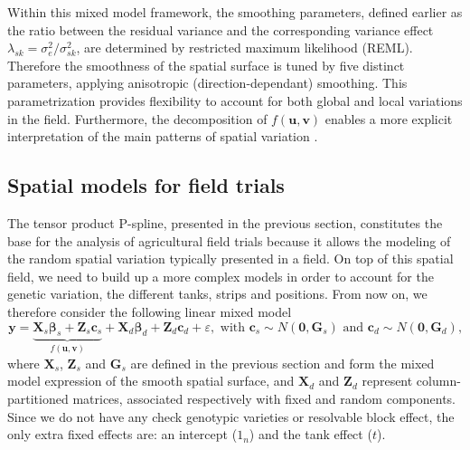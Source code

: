 Within this mixed model framework, the smoothing parameters, defined earlier as the ratio between the residual variance and the
corresponding variance effect $\lambda_{sk} = \sigma^2_{e} / \sigma^2_{sk}$, are determined by restricted maximum likelihood (REML). Therefore the smoothness of the spatial surface is tuned by five distinct parameters, applying anisotropic (direction-dependant) smoothing. This parametrization provides flexibility to account for both global and local variations in the field. Furthermore, the decomposition of $f(\mathbf{u},\mathbf{v})$ enables a more explicit interpretation of the main patterns of spatial variation \parencite{rodriguez-alvarez_correcting_2018}.





\subsection{Spatial models for field trials}
The tensor product P-spline, presented in the previous section, constitutes the base for the analysis of agricultural field trials because it allows the modeling of the random spatial variation typically presented in a field. 
On top of this spatial field, we need to build up a more complex models in order to account for the genetic variation, the different tanks, strips and positions. From now on, we therefore consider the following linear mixed model
\begin{equation}
    \boldsymbol{y}=
    \underbrace{
    	\boldsymbol{X}_{s} \boldsymbol{\beta}_{s}+
    	\boldsymbol{Z}_{s} \boldsymbol{c}_{s}
    	}_{f(\boldsymbol{u}, \boldsymbol{v})}+
    \boldsymbol{X}_{d} \boldsymbol{\beta}_{d}+
    \boldsymbol{Z}_{d} \boldsymbol{c}_{d}+
    \varepsilon, 
    \text { with } 
    \boldsymbol{c}_{s} \sim N\left(\mathbf{0}, \boldsymbol{G}_{s}\right) 
    \text { and } 
    \boldsymbol{c}_{d} \sim N\left(\mathbf{0}, \boldsymbol{G}_{d}\right)
    \text{,}
    \label{eq:full_random_and_additonal_effects_model}
\end{equation}
where $\boldsymbol{X}_{s}$, $\boldsymbol{Z}_{s}$ and $\boldsymbol{G}_{s}$ are defined in the previous section and form the mixed model expression of the smooth spatial surface, and $\boldsymbol{X}_{d}$ and $\boldsymbol{Z}_{d}$ represent column-partitioned matrices, associated respectively with fixed and random components. Since we do not have any check genotypic varieties or resolvable block effect, the only extra fixed effects are: an intercept ($1_n$) and the tank effect ($t$). 
